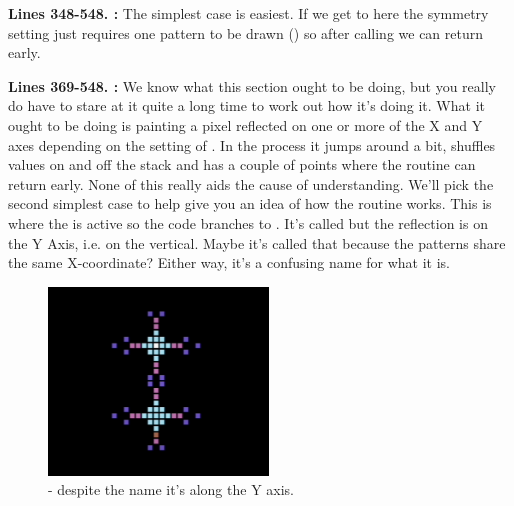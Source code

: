 \textbf{Lines 348-548. :} The simplest case is easiest. If we get to here
the symmetry setting just requires one pattern to be drawn () so after calling 
we can return early.

\textbf{Lines 369-548. :} We know what this section ought to be doing, but you really do have
to stare at it quite a long time to work out how it's doing it. What it ought to be doing is painting a pixel reflected on one or more
of the X and Y axes depending on the setting of . In the process it jumps around a bit,
shuffles values on and off the stack and has a couple of points where the routine can return early. None of this really aids
the cause of understanding. We'll pick the second simplest case to help give you an idea of how the routine works. This is where
the  is active so the code branches to .
It's called  but the reflection is on the Y Axis, i.e.
on the vertical. Maybe it's called that because the patterns share the same X-coordinate? Either way, it's a confusing name for what
it is.

\begin{figure}[H]
    \centering
      \includegraphics[height=5cm]{src/symmetries/xaxis.png}
  \caption*{ - despite the name it's along the Y axis.}
\end{figure}

